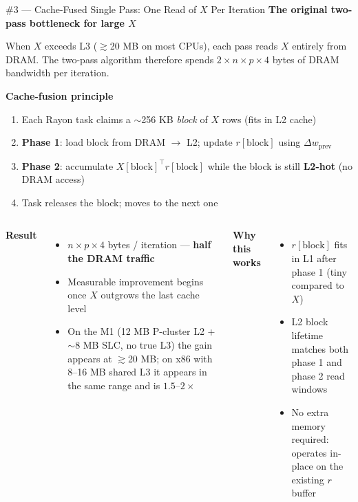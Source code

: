 \documentclass[aspectratio=169]{beamer}
\begin{document}
\begin{frame}{\#3 — Cache-Fused Single Pass: One Read of $X$ Per Iteration}
  \textbf{The original two-pass bottleneck for large $X$}

  \vspace{0.3em}
  When $X$ exceeds L3 ($\gtrsim$20 MB on most CPUs), each pass reads $X$
  entirely from DRAM.  The two-pass algorithm therefore spends
  $2 \times n \times p \times 4$ bytes of DRAM bandwidth per iteration.

  \vspace{0.6em}
  \textbf{Cache-fusion principle}
  \begin{enumerate}
    \item Each Rayon task claims a $\sim$256 KB \emph{block} of $X$ rows
          (fits in L2 cache)
    \item \textbf{Phase 1}: load block from DRAM $\to$ L2; update $r[\text{block}]$
          using $\Delta w_{\text{prev}}$
    \item \textbf{Phase 2}: accumulate $X[\text{block}]^\top r[\text{block}]$
          while the block is still \textbf{L2-hot} (no DRAM access)
    \item Task releases the block; moves to the next one
  \end{enumerate}

  \vspace{0.4em}
  \begin{columns}
    \textbf{Result}
    \begin{itemize}
      \item $n \times p \times 4$ bytes / iteration — \textbf{half the DRAM traffic}
      \item Measurable improvement begins once $X$ outgrows the last cache level
      \item On the M1 (12 MB P-cluster L2 + $\sim$8 MB SLC, no true L3) the gain
            appears at $\gtrsim$20 MB; on x86 with 8--16 MB shared L3 it appears
            in the same range and is $1.5$--$2\times$
    \end{itemize}
    \textbf{Why this works}
    \begin{itemize}
      \item $r[\text{block}]$ fits in L1 after phase 1 (tiny compared to $X$)
      \item L2 block lifetime matches both phase 1 and phase 2 read windows
      \item No extra memory required: operates in-place on the existing $r$ buffer
    \end{itemize}
  \end{columns}
\end{frame}
\end{document}
